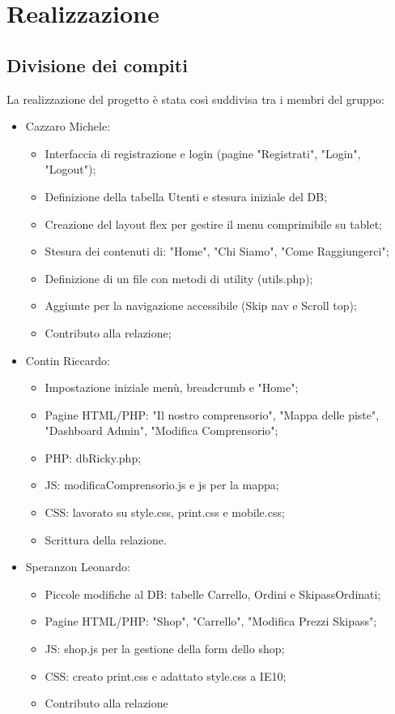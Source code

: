 \section{Realizzazione}

\subsection{Divisione dei compiti}

La realizzazione del progetto è stata così suddivisa tra i membri del gruppo:
\begin{itemize}
    \item Cazzaro Michele:
        \begin{itemize}
            \item Interfaccia di registrazione e login (pagine "Registrati", "Login", "Logout");
            \item Definizione della tabella Utenti e stesura iniziale del DB;
            \item Creazione del layout flex per gestire il menu comprimibile su tablet;
            \item Stesura dei contenuti di: "Home", "Chi Siamo", "Come Raggiungerci";
            \item Definizione di un file con metodi di utility (utils.php);
            \item Aggiunte per la navigazione accessibile (Skip nav e Scroll top);
            \item Contributo alla relazione;
        \end{itemize}
    \item Contin Riccardo:
        \begin{itemize}
            \item Impostazione iniziale menù, breadcrumb e "Home";
            \item Pagine HTML/PHP: "Il nostro comprensorio", "Mappa delle piste", "Dashboard Admin", "Modifica Comprensorio";
            \item PHP: dbRicky.php;
            \item JS: modificaComprensorio.js e js per la mappa;
            \item CSS: lavorato su style.css, print.css e mobile.css;
            \item Scrittura della relazione.
        \end{itemize}
    \item Speranzon Leonardo:
        \begin{itemize}
            \item Piccole modifiche al DB: tabelle Carrello, Ordini e SkipassOrdinati;
            \item Pagine HTML/PHP: "Shop", "Carrello", "Modifica Prezzi Skipass";
            \item JS: shop.js per la gestione della form dello shop;
            \item CSS: creato print.css e adattato style.css a IE10;
            \item Contributo alla relazione
        \end{itemize}
\end{itemize}

